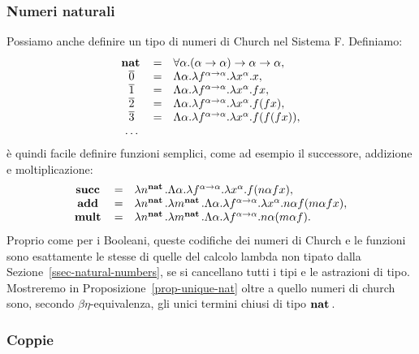 \documentclass{article}
\begin{document}
\subsubsection{Numeri naturali}

Possiamo anche definire un tipo di numeri di Church nel Sistema F. Definiamo:
\[ \begin{array}{ccl}
\mathop{\textbf{\bf nat}\,} &=& \forall\alpha.(\alpha\to\alpha)\to\alpha\to\alpha,\\
\mathop{\overline{0}} &=& \Lambda\alpha.\lambda f^{\alpha\to\alpha}.\lambda x^{\alpha}.x,\\
\mathop{\overline{1}} &=& \Lambda\alpha.\lambda f^{\alpha\to\alpha}.\lambda x^{\alpha}.fx,\\
\mathop{\overline{2}} &=& \Lambda\alpha.\lambda f^{\alpha\to\alpha}.\lambda x^{\alpha}.f(fx),\\
\mathop{\overline{3}} &=&
\Lambda\alpha.\lambda f^{\alpha\to\alpha}.\lambda x^{\alpha}.f(f(fx)),\\
\ldots
\end{array}
\]
\`e quindi facile definire funzioni semplici, come ad esempio il successore,
addizione e moltiplicazione:
\[ \begin{array}{ccl}
\mathop{\textbf{\bf succ}\,} &=& \lambda n^{\mathop{\textbf{\bf nat}\,}}.\Lambda\alpha.\lambda f^{\alpha\to\alpha}.\lambda x^{\alpha}.f(n\alpha f x),\\
\mathop{\textbf{\bf add}\,} &=&  \lambda n^{\mathop{\textbf{\bf nat}\,}}.\lambda m^{\mathop{\textbf{\bf nat}\,}}.\Lambda\alpha.\lambda f^{\alpha\to\alpha}.\lambda x^{\alpha}.n\alpha f(m\alpha fx), \\
\mathop{\textbf{\bf mult}\,} &=& \lambda n^{\mathop{\textbf{\bf nat}\,}}.\lambda m^{\mathop{\textbf{\bf nat}\,}}.\Lambda\alpha.\lambda f^{\alpha\to\alpha}.n\alpha (m\alpha f).
\end{array}
\]
Proprio come per i Booleani, queste codifiche dei numeri di Church
e le funzioni sono esattamente le stesse di quelle del calcolo lambda
non tipato dalla Sezione~\ref{ssec-natural-numbers}, se si cancellano tutti i tipi
e le astrazioni di tipo. Mostreremo in 
Proposizione~\ref{prop-unique-nat} oltre a quello  numeri di church sono,
secondo $\beta\eta$-equivalenza, gli unici termini chiusi di tipo $\mathop{\textbf{\bf nat}\,}$.

\subsubsection{Coppie}\label{ssec-pairs}
\end{document}
